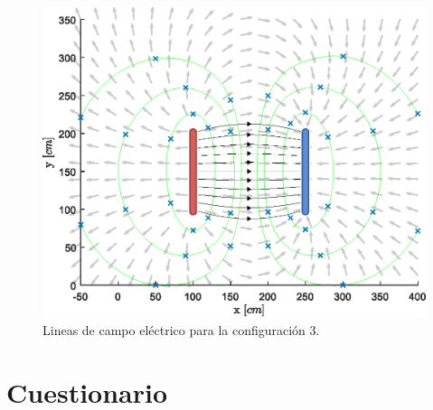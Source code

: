 \documentclass[letter,11pt]{article}
\begin{document}
\begin{figure}[!h]
\centering
\includegraphics[scale=0.91]{resources/p3.eps}
\caption{Lineas de campo eléctrico para la configuración 3.}
\label{figura10}
\end{figure}

\section{Cuestionario}
\end{document}
